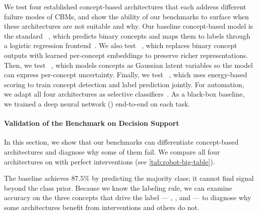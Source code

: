 \documentclass[11pt]{article}
\begin{document}
We test four established concept-based architectures that each address different failure modes of CBMs, and show the ability of our benchmarks to surface when these architectures are not suitable and why. Our baseline concept-based model is the standard \CBM{}~\citep{koh2020concept}, which predicts binary concepts and maps them to labels through a logistic regression frontend~\citep{mertk2022posthoc,joren2024classification}. We also test \CEM{}~\citep{zarlenga2022concept}, which replaces binary concept outputs with learned per-concept embeddings to preserve richer representations. 
Then, we test \ProbCBM{}~\citep{kim2023probabilistic}, which models concepts as Gaussian latent variables so the model can express per-concept uncertainty. 
Finally, we test \ECBM{}~\citep{xu2024energy}, which uses energy-based scoring to train concept detection and label prediction jointly. 
For automation, we adapt all four architectures as selective classifiers~\citep{joren2024classification}. As a black-box baseline, we trained a deep neural network (\DNN{}) end-to-end on each task.



\paragraph{Validation of the Benchmark on Decision Support}
\label{Sec::DecisionSupportValidation}

In this section, we show that our benchmarks can differentiate concept-based architectures and diagnose why some of them fail. We compare all four architectures on  with perfect interventions (see \cref{tab:robot-big-table}).

The \DNN{} baseline achieves $87.5\%$ by predicting the majority class; it cannot find signal beyond the class prior. Because we know the labeling rule, we can examine accuracy on the three concepts that drive the label --- , , and  --- to diagnose why some architectures benefit from interventions and others do not.
\end{document}
